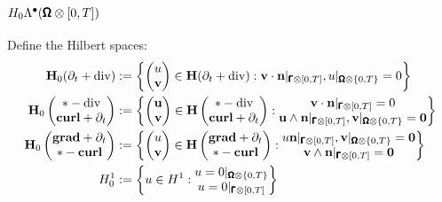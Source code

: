         \subsection*{$H_{0}\Lambda^{\bullet}(\pmb{\mathsf{\Omega}}\otimes[0, T])$}
            Define the Hilbert spaces:
            \begin{align}
                \mathbf{H}_{0}(\partial_{t} + \mathrm{div})  &:=  \left\{\begin{pmatrix} u \\ \mathbf{v} \end{pmatrix} \in \mathbf{H}(\partial_{t} + \mathrm{div}) : \mathbf{v}\cdot\mathbf{n}|_{\pmb{\mathsf{\Gamma}}\otimes[0, T]}, u|_{\pmb{\mathsf{\Omega}}\otimes\{0, T\}} = 0\right\}  \\
                \mathbf{H}_{0}\left(\begin{matrix} * - \mathrm{div} \\ \mathbf{curl} + \partial_{t} \end{matrix}\right)  &:=  \left\{\begin{pmatrix} \mathbf{u} \\ \mathbf{v} \end{pmatrix} \in \mathbf{H}\left(\begin{matrix} * - \mathrm{div} \\ \mathbf{curl} + \partial_{t} \end{matrix}\right) : \begin{matrix} \mathbf{v}\cdot\mathbf{n}|_{\pmb{\mathsf{\Gamma}}\otimes[0, T]} = 0 \\ \mathbf{u}\wedge\mathbf{n}|_{\pmb{\mathsf{\Gamma}}\otimes[0, T]}, \mathbf{v}|_{\pmb{\mathsf{\Omega}}\otimes\{0, T\}} = \mathbf{0} \end{matrix}\right\}  \\
                \mathbf{H}_{0}\left(\begin{matrix} \mathbf{grad} + \partial_{t} \\ * - \mathbf{curl} \end{matrix}\right)  &:=  \left\{\begin{pmatrix} u \\ \mathbf{v} \end{pmatrix} \in \mathbf{H}\left(\begin{matrix} \mathbf{grad} + \partial_{t} \\ * - \mathbf{curl} \end{matrix}\right) : \begin{matrix} u\mathbf{n}|_{\pmb{\mathsf{\Gamma}}\otimes[0, T]}, \mathbf{v}|_{\pmb{\mathsf{\Omega}}\otimes\{0, T\}} = \mathbf{0} \\ \mathbf{v}\wedge\mathbf{n}|_{\pmb{\mathsf{\Gamma}}\otimes[0, T]} = \mathbf{0} \end{matrix}\right\}  \\
                H^{1}_{0}  &:=  \left\{u \in H^{1} : \begin{matrix} u = 0|_{\pmb{\mathsf{\Omega}}\otimes\{0, T\}} \\ u = 0|_{\pmb{\mathsf{\Gamma}}\otimes[0, T]} \end{matrix}\right\}
            \end{align}
